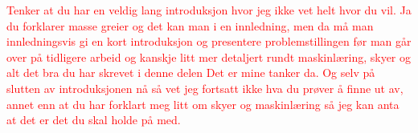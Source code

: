 \textcolor{red}{Tenker at du har en veldig lang introduksjon hvor jeg ikke vet helt hvor du vil. Ja du forklarer masse greier og det kan man i en innledning, men da må man innledningsvis gi en kort introduksjon og presentere problemstillingen før man går over på tidligere arbeid og kanskje litt mer detaljert rundt maskinlæring, skyer og alt det bra du har skrevet i denne delen Det er mine tanker da. Og selv på slutten av introduksjonen nå så vet jeg fortsatt ikke hva du prøver å finne ut av, annet enn at du har forklart meg litt om skyer og maskinlæring så jeg kan anta at det er det du skal holde på med. }
